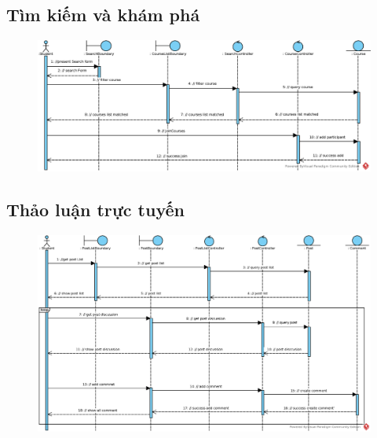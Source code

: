 \documentclass[./../main_file.tex]{subfiles}
\begin{document}
	\subsection{Tìm kiếm và khám phá}
	\begin{figure}[H]
		\centering
		\includegraphics[width=\linewidth]{./images/sequence_diagram/3_5_search_course.eps}
	\end{figure}
	
	\subsection{Thảo luận trực tuyến}
	\begin{figure}[H]
		\centering
		\includegraphics[width=\linewidth]{./images/sequence_diagram/3_6_forum_discussion.eps}
	\end{figure}
	
\end{document}

